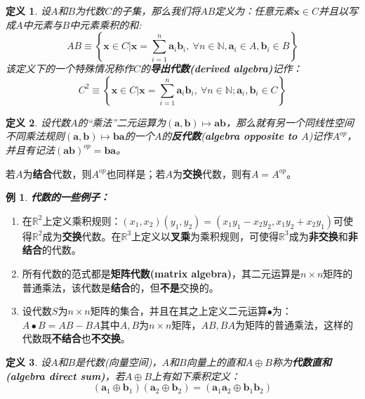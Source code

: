 \documentclass[mathserif,hyperref,UTF8,openany,b5paper]{ctexbook}
\newtheorem{exmp}{例}[section]
\newtheorem{defn}{定义}[section]
\begin{document}
\begin{defn}
设$A$和$B$为代数$C$的子集，那么我们将$AB$定义为：任意元素$\mathbf{x}\in C$并且以写成$A$中元素与$B$中元素乘积的和:
\begin{equation}
AB\equiv \left\{\mathbf{x}\in C|\mathbf{x}=\sum_{i=1}^n \mathbf{a}_i\mathbf{b}_i,\ \forall n\in \mathbb{N},\mathbf{a}_i\in A,\mathbf{b}_i\in B\right\}
\end{equation}该定义下的一个特殊情况称作$C$的\textbf{导出代数(derived algebra)}记作：
\begin{equation}
C^2\equiv \left\{\mathbf{x}\in C|\mathbf{x}=\sum_{i=1}^n \mathbf{a}_i\mathbf{b}_i,\ \forall n\in \mathbb{N};\mathbf{a}_i,\mathbf{b}_i\in C\right\}
\end{equation}
\end{defn}
\begin{defn}
设代数$A$的“乘法”二元运算为$\mathbf{(a,b)}\mapsto \mathbf{ab}$，那么就有另一个同线性空间不同乘法规则$\mathbf{(a,b)}\mapsto \mathbf{ba}$的一个$A$的\textbf{反代数}(\textbf{algebra opposite to $A$})记作$A^{op}$，并且有记法$\mathbf{(ab)}^{op}=\mathbf{ba}$。
\end{defn}
若$A$为\textbf{结合}代数，则$A^{op}$也同样是；若$A$为\textbf{交换}代数，则有$A=A^{op}$。
\begin{exmp}\textbf{代数的一些例子：}\end{exmp}
\begin{enumerate}
\item 在$\mathbb{R}^2$上定义乘积规则：$(x_1,x_2)(y_1,y_2)=(x_1y_1-x_2y_2,x_1y_2+x_2y_1)$可使得$\mathbb{R}^2$成为\textbf{交换}代数。在$\mathbb{R}^3$上定义以\textbf{叉乘}为乘积规则，可使得$\mathbb{R}^3$成为\textbf{非交换}和\textbf{非结合}的代数。
\item 所有代数的范式都是\textbf{矩阵代数(matrix algebra)}，其二元运算是$n \times n$矩阵的普通乘法，该代数是\textbf{结合}的，但\textbf{不是}交换的。
\item 设代数$S$为$n \times n$矩阵的集合，并且在其之上定义二元运算$\bullet$为：$A\bullet B=AB-BA$其中$A,B$为$n \times n$矩阵，$AB,BA$为矩阵的普通乘法，这样的代数既\textbf{不结合}也\textbf{不交换}。
\end{enumerate}
\begin{defn}
设$A$和$B$是代数(向量空间)，$A$和$B$向量上的直和$A\oplus B$称为\textbf{代数直和(algebra direct sum)}，若$A\oplus B$上有如下乘积定义：
\begin{equation}
    (\mathbf{a}_1\oplus\mathbf{b}_1)(\mathbf{a}_2\oplus\mathbf{b}_2)=(\mathbf{a}_1\mathbf{a}_2\oplus\mathbf{b}_1\mathbf{b}_2)
\end{equation}
\end{defn}
\end{document}
